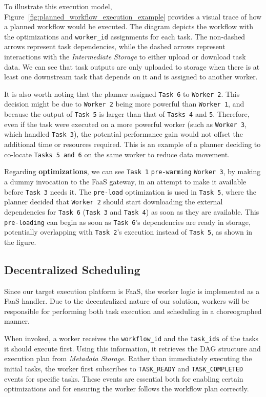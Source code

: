 \documentclass[conference]{IEEEtran}
\begin{document}
To illustrate this execution model, Figure~\ref{fig:planned_workflow_execution_example} provides a visual trace of how a planned workflow would be executed. The diagram depicts the workflow with the optimizations and \texttt{worker\_id} assignments for each task. The non-dashed arrows represent task dependencies, while the dashed arrows represent interactions with the \textit{Intermediate Storage} to either upload or download task data. We can see that task outputs are only uploaded to storage when there is at least one downstream task that depends on it and is assigned to another worker. 

It is also worth noting that the planner assigned \texttt{Task 6} to \texttt{Worker 2}. This decision might be due to \texttt{Worker 2} being more powerful than \texttt{Worker 1}, and because the output of \texttt{Task 5} is larger than that of \texttt{Tasks 4} and \texttt{5}. Therefore, even if the task were executed on a more powerful worker (such as \texttt{Worker 3}, which handled \texttt{Task 3}), the potential performance gain would not offset the additional time or resources required. This is an example of a planner deciding to co-locate \texttt{Tasks 5 and 6} on the same worker to reduce data movement.

Regarding \textbf{optimizations}, we can see \texttt{Task 1} \texttt{pre-warming} \texttt{Worker 3}, by making  a dummy invocation to the FaaS gateway, in an attempt to make it available before \texttt{Task 3} needs it. The \texttt{pre-load} optimization is used in \texttt{Task 5}, where the planner decided that \texttt{Worker 2} should start downloading the external dependencies for \texttt{Task 6} (\texttt{Task 3} and \texttt{Task 4}) as soon as they are available. This \texttt{pre-loading} can begin as soon as \texttt{Task 6}'s dependencies are ready in storage, potentially overlapping with \texttt{Task 2}'s execution instead of \texttt{Task 5}, as shown in the figure.


\subsection{Decentralized Scheduling}

Since our target execution platform is FaaS, the worker logic is implemented as a FaaS handler. Due to the decentralized nature of our solution, workers will be responsible for performing both task execution and scheduling in a choreographed manner. 

When invoked, a worker receives the \texttt{workflow\_id} and the \texttt{task\_ids} of the tasks it should execute first. Using this information, it retrieves the DAG structure and execution plan from \textit{Metadata Storage}. Rather than immediately executing the initial tasks, the worker first subscribes to \texttt{TASK\_READY} and \texttt{TASK\_COMPLETED} events for specific tasks. These events are essential both for enabling certain optimizations and for ensuring the worker follows the workflow plan correctly.
\end{document}
